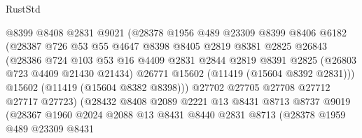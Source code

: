 \begin{lexlean}{RustStd}
\begin{coremodule}
                            @8399
                            @8408
                            @2831
                            @9021
                            (@28378
                              @1956
                              @489
                              @23309
                              @8399
                              @8406
                              @6182
                              (@28387
                                @726
                                @53
                                @55
                                @4647
                                @8398
                                @8405
                                @2819
                                @8381
                                @2825
                                @26843
                                (@28386
                                  @724
                                  @103
                                  @53
                                  @16
                                  @4409
                                  @2831
                                  @2844
                                  @2819
                                  @8391
                                  @2825
                                  (@26803 @723 @4409 @21430 @21434)
                                  @26771
                                  @15602
                                  (@11419 (@15604 @8392 @2831)))
                                @15602
                                (@11419 (@15604 @8382 @8398)))
                              @27702
                              @27705
                              @27708
                              @27712
                              @27717
                              @27723)
                            (@28432
                              @8408
                              @2089
                              @2221
                              @13
                              @8431
                              @8713
                              @8737
                              @9019
                              (@28367
                                @1960
                                @2024
                                @2088
                                @13
                                @8431
                                @8440
                                @2831
                                @8713
                                (@28378
                                  @1959
                                  @489
                                  @23309
                                  @8431

\end{coremodule}
\end{lexlean}
